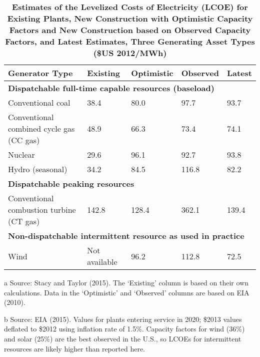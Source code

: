 \begin{table}[]

\caption{ \bf Estimates of the Levelized Costs of Electricity (LCOE) for Existing Plants, New Construction with Optimistic Capacity Factors and New Construction based on Observed Capacity Factors, and Latest Estimates, Three Generating Asset Types (\$US 2012/MWh)}



\centering
\begin{threeparttable}

\label{my-label2}
\begin{tabular}{@{}lllll@{}}
\toprule
Generator Type                           & Existing\tnote{a}      & Optimistic\tnote{a} & Observed \tnote{a} & Latest\tnote{b} \\ \midrule
\multicolumn{5}{l}{\textbf{Dispatchable full-time capable resources (baseload)}}             \\
Conventional coal                        & 38.4          & 80.0        & 97.7      & 93.7    \\
Conventional combined cycle gas (CC gas) & 48.9          & 66.3        & 73.4      & 74.1    \\
Nuclear                                  & 29.6          & 96.1        & 92.7      & 93.8    \\
Hydro (seasonal)                         & 34.2          & 84.5        & 116.8     & 82.2    \\ \midrule
\multicolumn{5}{l}{\textbf{Dispatchable peaking resources}}                                  \\
Conventional combustion turbine (CT gas) & 142.8         & 128.4       & 362.1     & 139.4   \\ \midrule
\multicolumn{5}{l}{\textbf{Non-dispatchable intermittent resource as used in practice}}      \\
Wind                                     & Not available & 96.2        & 112.8     & 72.5    \\ \bottomrule
\end{tabular}
    \begin{tablenotes}
      \small
      \item[a]  Source: Stacy and Taylor (2015). The ‘Existing’ column is based on their own calculations. Data in the ‘Optimistic’ and ‘Observed’ columns are based on EIA (2010).
      \item[b]  Source: EIA (2015). Values for plants entering service in 2020; \$2013 values deflated to \$2012 using inflation rate of 1.5\%. Capacity factors for wind (36\%) and solar (25\%) are the best observed in the U.S., so LCOEs for intermittent resources are likely higher than reported here.
    \end{tablenotes}

\end{threeparttable}
\end{table}

